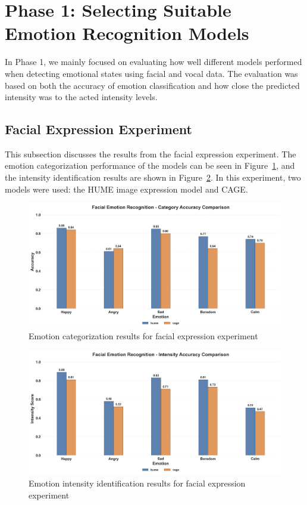\section{Phase 1: Selecting Suitable Emotion Recognition Models}\label{sec:res-phase1}
In Phase 1, we mainly focused on evaluating how well different models performed when detecting emotional states using facial and vocal data. The evaluation was based on both the accuracy of emotion classification and how close the predicted intensity was to the acted intensity levels.


\subsection{Facial Expression Experiment}
This subsection discusses the results from the facial expression experiment. The emotion categorization performance of the models can be seen in Figure~\ref{fig:facial-category}, and the intensity identification results are shown in Figure~\ref{fig:facial-intensity}. In this experiment, two models were used: the HUME image expression model and CAGE.

\begin{figure}[H]
    \centering
    \includegraphics[width=1\textwidth]{img/chapter_04/facial_category_comparison}
    \caption{Emotion categorization results for facial expression experiment}
    \label{fig:facial-category}
\end{figure}

\begin{figure}[H]
    \centering
    \includegraphics[width=1\textwidth]{img/chapter_04/facial_intensity_comparison}
    \caption{Emotion intensity identification results for facial expression experiment}
    \label{fig:facial-intensity}
\end{figure}

